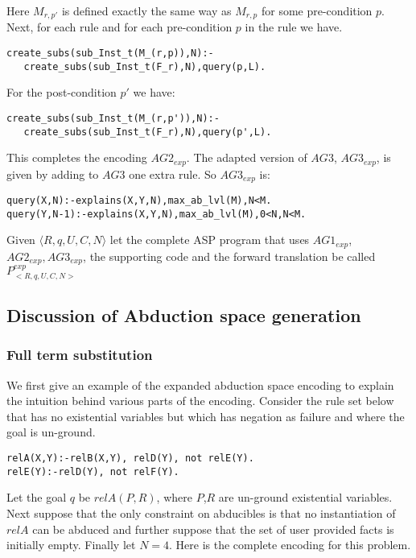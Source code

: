 Here $M_{r,p'}$ is defined exactly the same way as $M_{r,p}$ for some pre-condition $p$. Next, for each rule and for each pre-condition $p$ in the rule we have.
\begin{lstlisting}[frame=none]
create_subs(sub_Inst_t(M_(r,p)),N):-
   create_subs(sub_Inst_t(F_r),N),query(p,L).   
\end{lstlisting}

For the post-condition $p'$ we have:
\begin{lstlisting}[frame=none]
create_subs(sub_Inst_t(M_(r,p')),N):-
   create_subs(sub_Inst_t(F_r),N),query(p',L).   
\end{lstlisting}

This completes the encoding $AG2_{exp}$. The adapted version of $AG3$,
$AG3_{exp}$, is given by adding to $AG3$ one extra rule. So $AG3_{exp}$ is: 
\begin{lstlisting}[frame=none]
query(X,N):-explains(X,Y,N),max_ab_lvl(M),N<M.
query(Y,N-1):-explains(X,Y,N),max_ab_lvl(M),0<N,N<M.
\end{lstlisting}
Given $\langle R,q,U,C,N \rangle$ let the complete ASP program that uses $AG1_{exp}$, $AG2_{exp}, AG3_{exp}$, the supporting code and the forward translation be called $P_{<R,q,U,C,N>}^{exp}$
\subsection{Discussion of Abduction space generation}

\subsubsection{Full term substitution}
We first give an example of the expanded abduction space encoding to explain
the intuition behind various parts of the encoding. Consider the rule set
below that has no existential variables but which has negation as failure and
where the goal is un-ground.
\begin{lstlisting}[frame=none]
relA(X,Y):-relB(X,Y), relD(Y), not relE(Y).
relE(Y):-relD(Y), not relF(Y).
\end{lstlisting}
Let the goal $q$ be $relA(P,R)$, where $P$,$R$ are un-ground existential
variables. Next suppose that the only constraint on abducibles is that no
instantiation of $relA$ can be abduced and further suppose that the set of
user provided facts is initially empty. Finally let $N=4$. Here is the
complete encoding for this problem.

